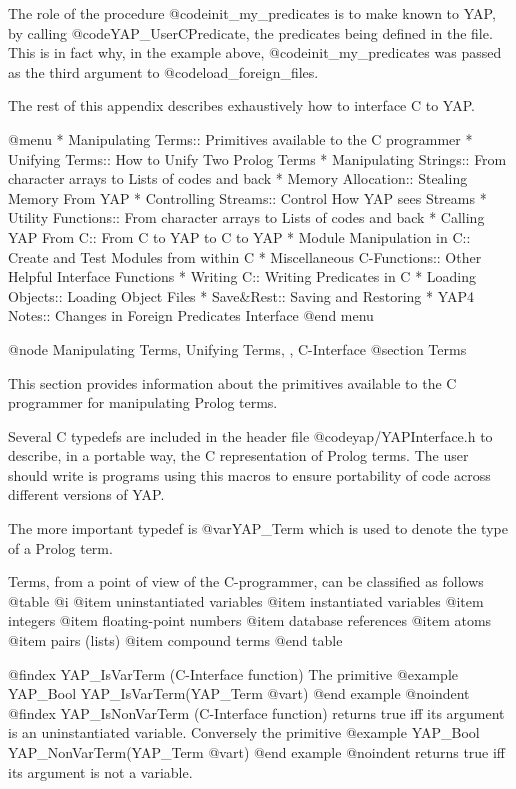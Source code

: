{{{{{{{{The role of the procedure @code{init_my_predicates} is to make known to
YAP, by calling @code{YAP_UserCPredicate}, the predicates being
defined in the file.  This is in fact why, in the example above,
@code{init_my_predicates} was passed as the third argument to
@code{load_foreign_files}.

The rest of this appendix describes exhaustively how to interface C to YAP.

@menu
* Manipulating Terms:: Primitives available to the C programmer
* Unifying Terms:: How to Unify Two Prolog Terms
* Manipulating Strings:: From character arrays to Lists of codes and back
* Memory Allocation:: Stealing Memory From YAP
* Controlling Streams:: Control How YAP sees Streams
* Utility Functions:: From character arrays to Lists of codes and back
* Calling YAP From C:: From C to YAP to C to YAP 
* Module Manipulation in C:: Create and Test Modules from within C
* Miscellaneous C-Functions:: Other Helpful Interface Functions
* Writing C:: Writing Predicates in C
* Loading Objects:: Loading Object Files
* Save&Rest:: Saving and Restoring
* YAP4 Notes:: Changes in Foreign Predicates Interface
@end menu

@node Manipulating Terms, Unifying Terms, , C-Interface
@section Terms

This section provides information about the primitives available to the C
programmer for manipulating Prolog terms.

Several C typedefs are included in the header file @code{yap/YAPInterface.h} to
describe, in a portable way, the C representation of Prolog terms.
The user should write is programs using this macros to ensure portability of
code across different versions of YAP.


The more important typedef is @var{YAP_Term} which is used to denote the
type of a Prolog term.

Terms, from a point of view of the C-programmer,  can be classified as
follows
@table @i
@item    uninstantiated variables
@item    instantiated variables
@item    integers
@item    floating-point numbers
@item    database references
@item    atoms
@item    pairs (lists)
@item    compound terms
@end table

@findex YAP_IsVarTerm (C-Interface function)
The primitive
@example
     YAP_Bool YAP_IsVarTerm(YAP_Term @var{t})
@end example
@noindent
@findex YAP_IsNonVarTerm (C-Interface function)
returns true iff its argument is an uninstantiated variable. Conversely the
primitive
@example
      YAP_Bool YAP_NonVarTerm(YAP_Term @var{t})
@end example
@noindent
returns true iff its argument is not a variable.


}}}}}}}}
